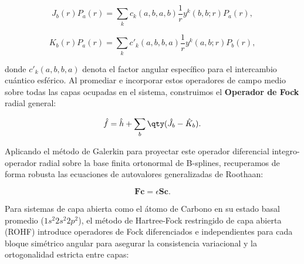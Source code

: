 \begin{equation}
  J_b(r) P_a(r) = \sum_k c_k(a,b,a,b) \frac{1}{r} y^k(b,b; r) P_a(r),
\end{equation}

\begin{equation}
  K_b(r) P_a(r) = \sum_k c'_k(a,b,b,a) \frac{1}{r} y^k(a,b; r) P_b(r),
\end{equation}

donde \( c'_k(a,b,b,a) \) denota el factor angular específico para el intercambio cuántico esférico. Al promediar e incorporar estos operadores de campo medio sobre todas las capas ocupadas en el sistema, construimos el \textbf{Operador de Fock} radial general:

\begin{equation}
  \hat{f} = \hat{h} + \sum_b \qty( \hat{J}_b - \hat{K}_b ).
\end{equation}

Aplicando el método de Galerkin para proyectar este operador diferencial integro-operador radial sobre la base finita ortonormal de B-splines, recuperamos de forma robusta las ecuaciones de autovalores generalizadas de Roothaan:

\begin{equation}
  \bm{F}\bm{c} = \epsilon\bm{S}\bm{c}.
\end{equation}

Para sistemas de capa abierta como el átomo de Carbono en su estado basal promedio (\( 1s^2 2s^2 2p^2 \)), el método de Hartree-Fock restringido de capa abierta (ROHF) introduce operadores de Fock diferenciados e independientes para cada bloque simétrico angular para asegurar la consistencia variacional y la ortogonalidad estricta entre capas:

